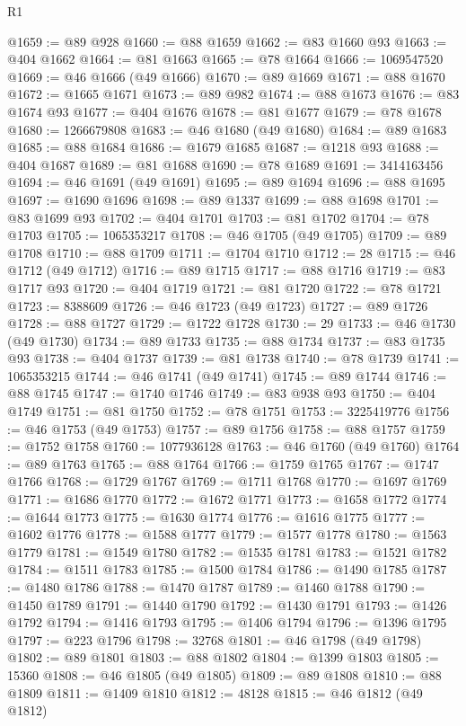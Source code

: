 \begin{lexlean}{R1}
\begin{coremodule}
@1659 := @89 @928
@1660 := @88 @1659
@1662 := @83 @1660 @93
@1663 := @404 @1662
@1664 := @81 @1663
@1665 := @78 @1664
@1666 := 1069547520
@1669 := @46 @1666 (@49 @1666)
@1670 := @89 @1669
@1671 := @88 @1670
@1672 := @1665 @1671
@1673 := @89 @982
@1674 := @88 @1673
@1676 := @83 @1674 @93
@1677 := @404 @1676
@1678 := @81 @1677
@1679 := @78 @1678
@1680 := 1266679808
@1683 := @46 @1680 (@49 @1680)
@1684 := @89 @1683
@1685 := @88 @1684
@1686 := @1679 @1685
@1687 := @1218 @93
@1688 := @404 @1687
@1689 := @81 @1688
@1690 := @78 @1689
@1691 := 3414163456
@1694 := @46 @1691 (@49 @1691)
@1695 := @89 @1694
@1696 := @88 @1695
@1697 := @1690 @1696
@1698 := @89 @1337
@1699 := @88 @1698
@1701 := @83 @1699 @93
@1702 := @404 @1701
@1703 := @81 @1702
@1704 := @78 @1703
@1705 := 1065353217
@1708 := @46 @1705 (@49 @1705)
@1709 := @89 @1708
@1710 := @88 @1709
@1711 := @1704 @1710
@1712 := 28
@1715 := @46 @1712 (@49 @1712)
@1716 := @89 @1715
@1717 := @88 @1716
@1719 := @83 @1717 @93
@1720 := @404 @1719
@1721 := @81 @1720
@1722 := @78 @1721
@1723 := 8388609
@1726 := @46 @1723 (@49 @1723)
@1727 := @89 @1726
@1728 := @88 @1727
@1729 := @1722 @1728
@1730 := 29
@1733 := @46 @1730 (@49 @1730)
@1734 := @89 @1733
@1735 := @88 @1734
@1737 := @83 @1735 @93
@1738 := @404 @1737
@1739 := @81 @1738
@1740 := @78 @1739
@1741 := 1065353215
@1744 := @46 @1741 (@49 @1741)
@1745 := @89 @1744
@1746 := @88 @1745
@1747 := @1740 @1746
@1749 := @83 @938 @93
@1750 := @404 @1749
@1751 := @81 @1750
@1752 := @78 @1751
@1753 := 3225419776
@1756 := @46 @1753 (@49 @1753)
@1757 := @89 @1756
@1758 := @88 @1757
@1759 := @1752 @1758
@1760 := 1077936128
@1763 := @46 @1760 (@49 @1760)
@1764 := @89 @1763
@1765 := @88 @1764
@1766 := @1759 @1765
@1767 := @1747 @1766
@1768 := @1729 @1767
@1769 := @1711 @1768
@1770 := @1697 @1769
@1771 := @1686 @1770
@1772 := @1672 @1771
@1773 := @1658 @1772
@1774 := @1644 @1773
@1775 := @1630 @1774
@1776 := @1616 @1775
@1777 := @1602 @1776
@1778 := @1588 @1777
@1779 := @1577 @1778
@1780 := @1563 @1779
@1781 := @1549 @1780
@1782 := @1535 @1781
@1783 := @1521 @1782
@1784 := @1511 @1783
@1785 := @1500 @1784
@1786 := @1490 @1785
@1787 := @1480 @1786
@1788 := @1470 @1787
@1789 := @1460 @1788
@1790 := @1450 @1789
@1791 := @1440 @1790
@1792 := @1430 @1791
@1793 := @1426 @1792
@1794 := @1416 @1793
@1795 := @1406 @1794
@1796 := @1396 @1795
@1797 := @223 @1796
@1798 := 32768
@1801 := @46 @1798 (@49 @1798)
@1802 := @89 @1801
@1803 := @88 @1802
@1804 := @1399 @1803
@1805 := 15360
@1808 := @46 @1805 (@49 @1805)
@1809 := @89 @1808
@1810 := @88 @1809
@1811 := @1409 @1810
@1812 := 48128
@1815 := @46 @1812 (@49 @1812)

\end{coremodule}
\end{lexlean}
